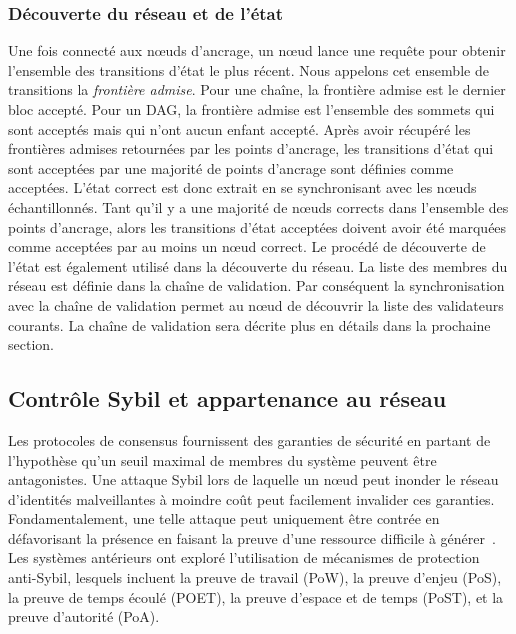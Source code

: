 \documentclass[runningheads,francais,a4paper]{llncs}
\begin{document}
\subsubsection{Découverte du réseau et de l'état}
Une fois connecté aux nœuds d'ancrage, un nœud lance une requête pour obtenir l'ensemble des transitions d'état
le plus récent. Nous appelons cet ensemble de transitions la \emph{frontière admise}. Pour une chaîne, la frontière
admise est le dernier bloc accepté. Pour un DAG, la frontière admise est l'ensemble des sommets qui sont acceptés mais
qui n'ont aucun enfant accepté. Après avoir récupéré les frontières admises retournées par les points d'ancrage, les
transitions d'état qui sont acceptées par une majorité de points d'ancrage sont définies comme acceptées. L'état correct
est donc extrait en se synchronisant avec les nœuds échantillonnés. Tant qu'il y a une majorité de nœuds corrects
dans l'ensemble des points d'ancrage, alors les transitions d'état acceptées doivent avoir été marquées comme
acceptées par au moins un nœud correct. Le procédé de découverte de l'état est également utilisé dans la découverte
du réseau. La liste des membres du réseau est définie dans la chaîne de validation. Par conséquent la synchronisation
avec la chaîne de validation permet au nœud de découvrir la liste des validateurs courants. La chaîne de validation
sera décrite plus en détails dans la prochaine section.

\subsection{Contrôle Sybil et appartenance au réseau}
Les protocoles de consensus fournissent des garanties de sécurité en partant de l'hypothèse qu'un seuil maximal de
membres du système peuvent être antagonistes. Une attaque Sybil lors de laquelle un nœud peut inonder le réseau
d'identités malveillantes à moindre coût peut facilement invalider ces garanties. Fondamentalement, une telle attaque peut
uniquement être contrée en défavorisant la présence en faisant la preuve d'une ressource difficile à
générer~\cite{douceur2002sybil}. Les systèmes antérieurs ont exploré l'utilisation de mécanismes de protection anti-Sybil,
lesquels incluent la preuve de travail (PoW), la preuve d'enjeu (PoS), la preuve de temps écoulé (POET), la preuve d'espace
et de temps (PoST), et la preuve d'autorité (PoA).
\end{document}

